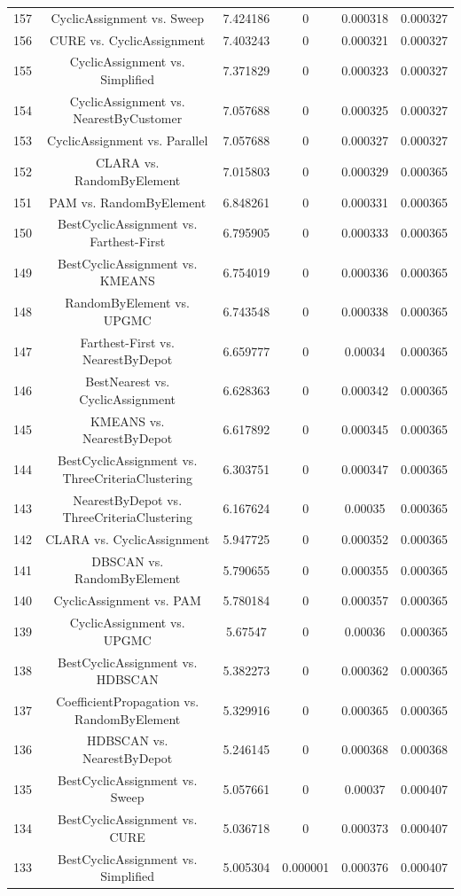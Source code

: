 \documentclass[a4paper,10pt]{article}
\begin{document}
\begin{landscape}
\begin{table}[!htp]
\begin{tabular}{cccccc}
157&CyclicAssignment vs. Sweep&7.424186&0&0.000318&0.000327\\
156&CURE vs. CyclicAssignment&7.403243&0&0.000321&0.000327\\
155&CyclicAssignment vs. Simplified&7.371829&0&0.000323&0.000327\\
154&CyclicAssignment vs. NearestByCustomer&7.057688&0&0.000325&0.000327\\
153&CyclicAssignment vs. Parallel&7.057688&0&0.000327&0.000327\\
152&CLARA vs. RandomByElement&7.015803&0&0.000329&0.000365\\
151&PAM vs. RandomByElement&6.848261&0&0.000331&0.000365\\
150&BestCyclicAssignment vs. Farthest-First&6.795905&0&0.000333&0.000365\\
149&BestCyclicAssignment vs. KMEANS&6.754019&0&0.000336&0.000365\\
148&RandomByElement vs. UPGMC&6.743548&0&0.000338&0.000365\\
147&Farthest-First vs. NearestByDepot&6.659777&0&0.00034&0.000365\\
146&BestNearest vs. CyclicAssignment&6.628363&0&0.000342&0.000365\\
145&KMEANS vs. NearestByDepot&6.617892&0&0.000345&0.000365\\
144&BestCyclicAssignment vs. ThreeCriteriaClustering&6.303751&0&0.000347&0.000365\\
143&NearestByDepot vs. ThreeCriteriaClustering&6.167624&0&0.00035&0.000365\\
142&CLARA vs. CyclicAssignment&5.947725&0&0.000352&0.000365\\
141&DBSCAN vs. RandomByElement&5.790655&0&0.000355&0.000365\\
140&CyclicAssignment vs. PAM&5.780184&0&0.000357&0.000365\\
139&CyclicAssignment vs. UPGMC&5.67547&0&0.00036&0.000365\\
138&BestCyclicAssignment vs. HDBSCAN&5.382273&0&0.000362&0.000365\\
137&CoefficientPropagation vs. RandomByElement&5.329916&0&0.000365&0.000365\\
136&HDBSCAN vs. NearestByDepot&5.246145&0&0.000368&0.000368\\
135&BestCyclicAssignment vs. Sweep&5.057661&0&0.00037&0.000407\\
134&BestCyclicAssignment vs. CURE&5.036718&0&0.000373&0.000407\\
133&BestCyclicAssignment vs. Simplified&5.005304&0.000001&0.000376&0.000407\\

\end{tabular}
\end{table}
\end{landscape}
\end{document}
